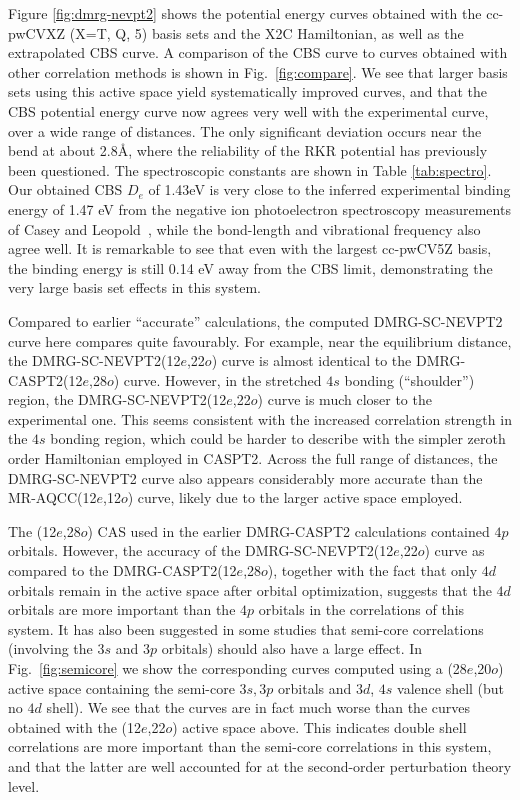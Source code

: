 Figure \ref{fig:dmrg-nevpt2} shows the potential energy curves obtained with the cc-pwCVXZ (X=T, Q, 5) basis sets and the X2C Hamiltonian, as well as the extrapolated
CBS curve. A comparison of the CBS curve to curves obtained with other
correlation methods is shown in Fig.~\ref{fig:compare}.
We see that larger basis sets using this active space yield systematically improved curves, and that
the CBS potential energy curve now agrees very well with the experimental curve, over a wide range of distances. The only significant deviation occurs near the bend at about 2.8\AA, where the reliability of the RKR potential  has previously been questioned.\cite{roos_ground_2003}
The spectroscopic constants are shown in Table \ref{tab:spectro}.
Our obtained CBS $D_e$ of 1.43eV is very close to the inferred experimental binding energy of 1.47 eV from
the negative ion photoelectron spectroscopy measurements
of Casey and Leopold~\cite{casey_negative_1993}, while the bond-length and vibrational frequency also agree well. It is remarkable to see that even
with the largest cc-pwCV5Z basis, the binding energy is still 0.14 eV away from the CBS limit,  demonstrating the very large basis set 
effects in this system.  

Compared to earlier ``accurate'' calculations, the computed DMRG-SC-NEVPT2 curve 
here compares  quite favourably. For example, near the equilibrium
distance, the DMRG-SC-NEVPT2(12$e$,22$o$) curve is almost identical to the DMRG-CASPT2(12$e$,28$o$) curve\cite{kurashige_second-order_2011}. However, in the stretched $4s$ bonding (``shoulder'') region, the DMRG-SC-NEVPT2(12$e$,22$o$) curve is much closer to the experimental one. This seems consistent with the increased correlation strength in the $4s$ bonding region, which could be harder to describe with the simpler zeroth order Hamiltonian employed in CASPT2. Across the full range of distances, the DMRG-SC-NEVPT2 curve also appears considerably more accurate than the MR-AQCC(12$e$,12$o$) curve, likely due to the larger active space employed.

The (12$e$,28$o$) CAS used in the earlier DMRG-CASPT2 calculations 
contained $4p$ orbitals. However, the accuracy of the DMRG-SC-NEVPT2(12$e$,22$o$) curve as compared to the DMRG-CASPT2(12$e$,28$o$), together with the fact that only $4d$ orbitals remain in the active space after orbital optimization, suggests that the $4d$ orbitals are more important than the $4p$ orbitals in the correlations of this system. It has also been suggested in some studies
that semi-core correlations (involving the $3s$ and $3p$ orbitals) should also have  a large effect. In Fig.~\ref{fig:semicore} we show the corresponding curves
computed using a (28$e$,20$o$) active space containing the semi-core $3s, 3p$ orbitals and $3d$, $4s$ valence shell (but no $4d$ shell). We see that the curves are in fact much worse than the curves obtained with the (12$e$,22$o$) active space above. This 
indicates double shell correlations are more important than 
the semi-core correlations in this system, and that the latter are well accounted for at the second-order perturbation theory level.

